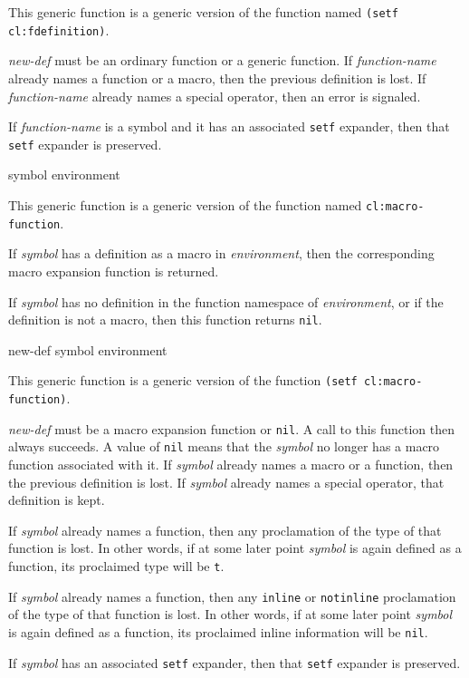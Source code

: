 This generic function is a generic version of the \commonlisp{}
function named \texttt{(setf cl:fdefinition)}.

\textit{new-def} must be an ordinary function or a generic function.
If \textit{function-name} already names a function or a macro, then
the previous definition is lost.  If \textit{function-name} already
names a special operator, then an error is signaled.

If \textit{function-name} is a symbol and it has an associated
\texttt{setf} expander, then that \texttt{setf} expander is preserved.

 {symbol environment}

This generic function is a generic version of the \commonlisp{}
function named \texttt{cl:macro-function}.

If \textit{symbol} has a definition as a macro in
\textit{environment}, then the corresponding macro expansion function
is returned.

If \textit{symbol} has no definition in the function namespace of
\textit{environment}, or if the definition is not a macro, then this
function returns \texttt{nil}.

 {new-def symbol environment}

This generic function is a generic version of the \commonlisp{}
function \texttt{(setf cl:macro-function)}.

\textit{new-def} must be a macro expansion function or \texttt{nil}.
A call to this function then always succeeds.  A value of \texttt{nil}
means that the \textit{symbol} no longer has a macro function
associated with it.  If \textit{symbol} already names a macro or a
function, then the previous definition is lost.  If \textit{symbol}
already names a special operator, that definition is kept.

If \textit{symbol} already names a function, then any proclamation of
the type of that function is lost.  In other words, if at some later
point \textit{symbol} is again defined as a function, its proclaimed
type will be \texttt{t}.

If \textit{symbol} already names a function, then any \texttt{inline} or
\texttt{notinline} proclamation of the type of that function is lost.  In other
words, if at some later point \textit{symbol} is again defined as a
function, its proclaimed inline information will be \texttt{nil}.

If \textit{symbol} has an associated \texttt{setf} expander, then that
\texttt{setf} expander is preserved.

